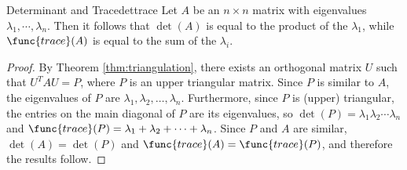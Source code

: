 \begin{corollary}{Determinant and Trace}{dettrace}
Let $A$ be an $n \times n$ matrix with eigenvalues $\lambda_1, \cdots, \lambda_n$. Then it follows that $\det(A)$ is equal to the product of the $\lambda_1$, while $\func{trace}(A)$ is equal to the sum of the $\lambda_i$. 
\end{corollary}

\begin{proof}
By Theorem \ref{thm:triangulation}, there exists an orthogonal matrix $U$ such
that $U^TAU=P$, where $P$ is an upper triangular matrix.
Since $P$ is similar to $A$, the eigenvalues
of $P$ are $\lambda_1, \lambda_2, \ldots, \lambda_n$.
Furthermore, since $P$ is (upper) triangular, the entries on the
main diagonal of $P$ are its eigenvalues, so
$\det(P)=\lambda_1 \lambda_2 \cdots \lambda_n$ and
$\func{trace}(P)=\lambda_1 + \lambda_2 + \cdots + \lambda_n$.
Since $P$ and $A$ are similar, $\det(A)=\det(P)$ and $\func{trace}(A)=\func{trace}(P)$,
and therefore the results follow.
\end{proof}
